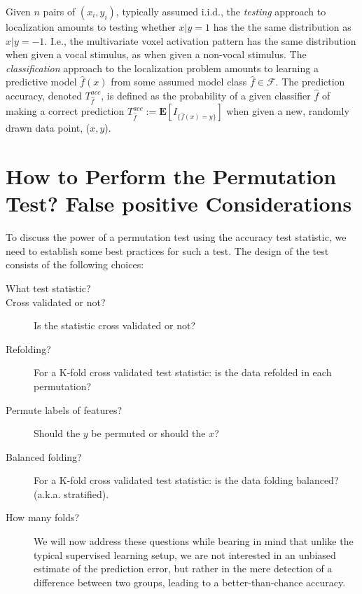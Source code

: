 \documentclass{pnastwo}
\newcommand{\set}[1]{\{ #1 \}} %
\newcommand{\indicator}[1]{I_{\set{#1}}} %
\newcommand{\features}{x} %
\newcommand{\outcomes}{y} %
\newcommand{\hyp}{f} %
\newcommand{\hypEstim}{\hat{\hyp}} %
\newcommand{\hypclass}{\mathcal{F}}
\newcommand{\expect}[1]{\mathbf{E}\left[ #1 \right]} %
\newcommand{\acc}{T^{acc}}
\begin{document}
\begin{article}
Given $n$ pairs of $(\features_i,\outcomes_i)$, typically assumed i.i.d., the \emph{testing} approach to localization amounts to testing whether $\features|\outcomes=1$ has the the same distribution as $\features|\outcomes=-1$.
I.e., the multivariate voxel activation pattern has the same distribution when given a vocal stimulus, as when given a non-vocal stimulus. 
The \emph{classification} approach to the localization problem amounts to learning a predictive model $\hypEstim(\features)$ from some assumed model class $\hypEstim \in \hypclass$. 
The prediction accuracy, denoted $\acc_{\hypEstim}$, is defined as the probability of a given classifier $\hypEstim$ of making a correct prediction $\acc_{\hypEstim}:=\expect{\indicator{\hypEstim(x)=y}}$ when given a new, randomly drawn data point, ($\features,\outcomes$).





\section{How to Perform the Permutation Test? False positive Considerations}
\label{sec:considerations}

To discuss the power of a permutation test using the accuracy test statistic, we need to establish some best practices for such a test. 
The design of the test consists of the following choices: 
\begin{description}
\item [What test statistic?] 
\item [Cross validated or not?] Is the statistic cross validated or not?
\item [Refolding?] For a K-fold cross validated test statistic: is the data refolded in each permutation? 
\item [Permute labels of features?] Should the $\outcomes$ be permuted or should the $\features$?
\item [Balanced folding?] For a K-fold cross validated test statistic: is the data folding balanced? (a.k.a. stratified).
\item [How many folds?] 

We will now address these questions while bearing in mind that unlike the typical supervised learning setup, we are not interested in an unbiased estimate of the prediction error, but rather in the mere detection of a difference between two groups, leading to a better-than-chance accuracy. 



\end{description}
\end{article}
\end{document}

